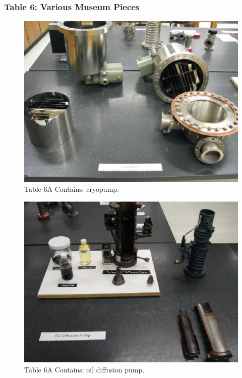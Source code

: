 \documentclass{book}
\begin{document}
\subsubsection{Table 6: Various Museum Pieces}

\begin{figure}[H]
\includegraphics[scale=0.9]{Museum-Pieces-Table6A}
\caption[align=left]{Table 6A Contains: cryopump.}
\end{figure}

\begin{figure}[H]
\includegraphics[scale=0.9]{Museum-Pieces-Table6B}
\caption[align=left]{Table 6A Contains: oil diffusion pump.}
\end{figure}
\end{document}
